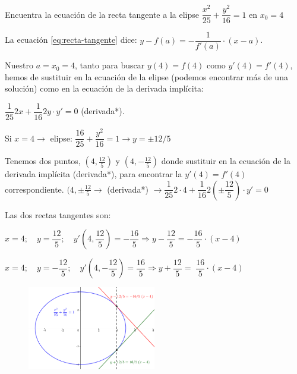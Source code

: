 	\begin{ejem}
	Encuentra la ecuación de la recta tangente a la elipse $\dfrac{x^2}{25} + \dfrac {y^2}{16} =1$ en $x_0=4$
	 \begin{multicols}{2}
	 La ecuación \ref{eq:recta-tangente} dice: $y-f(a)=-\dfrac 1 {f'(a)}\cdot(x-a)$. 
	
	Nuestro $a=x_0=4$, tanto para buscar $y(4)=f(4)$ como $y'(4)=f'(4)$, hemos de sustituir en la ecuación de la elipse (podemos encontrar más de una solución) como en la ecuación de la derivada implícita:
	
	$\dfrac 1 {25} 2x + \dfrac 1 {16} 2y\cdot y' =0$ (derivada*).
	
	Si $x=4 \to $ elipse:  $\dfrac {16}{25}+\dfrac {y^2}{16}=1 \to y=\pm 12/5$
	
	Tenemos dos puntos, $(4,\frac {12}{5})$ y $(4,-\frac {12}{5})$ donde sustituir en la ecuación de la derivada implícita (derivada*), para encontrar la $y'(4)=f'(4)$ correspondiente. $(4,\pm\frac {12}{5} \to $ (derivada*) $\to \dfrac 1 {25} 2\cdot 4 + \dfrac 1 {16} 2 \left(\pm 	\dfrac {12}{5}  \right) \cdot y' =0$
	
	Las dos rectas tangentes son:
	
	$x=4;\quad y=\dfrac {12}{5}; \quad y'(4,\dfrac {12}{5})=-\dfrac {16} {5} \Rightarrow  y- \dfrac {12}{5} =-\dfrac {16} {5} \cdot (x-4)$
	
	$x=4;\quad y=-\dfrac {12}{5}; \quad y'(4,-\dfrac {12}{5})=\dfrac {16} {5} \Rightarrow  y+ \dfrac {12}{5} =\; \dfrac {16} {5} \cdot (x-4)$
	
	\begin{figure}[H]
		\centering
		\includegraphics[width=0.5\textwidth]{imagenes/imagenes05/T05IM02.png}
	\end{figure}
	
	
	 \end{multicols}
		
	\end{ejem}
	

